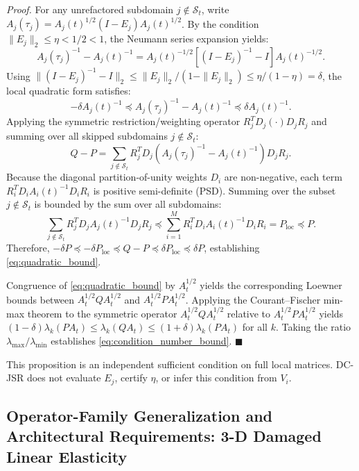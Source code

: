 \noindent\textit{Proof.}
For any unrefactored subdomain $j \notin \mathcal{S}_t$, write $A_j(\tau_j) = A_j(t)^{1/2} (I - E_j) A_j(t)^{1/2}$. By the condition $\|E_j\|_2 \le \eta < 1/2 < 1$, the Neumann series expansion yields:
\begin{equation}
A_j(\tau_j)^{-1} - A_j(t)^{-1} = A_j(t)^{-1/2} \left[ (I - E_j)^{-1} - I \right] A_j(t)^{-1/2}.
\end{equation}
Using $\|(I - E_j)^{-1} - I\|_2 \le \|E_j\|_2 / (1 - \|E_j\|_2) \le \eta / (1 - \eta) = \delta$, the local quadratic form satisfies:
\begin{equation}
-\delta A_j(t)^{-1} \preceq A_j(\tau_j)^{-1} - A_j(t)^{-1} \preceq \delta A_j(t)^{-1}.
\end{equation}
Applying the symmetric restriction/weighting operator $R_j^T D_j (\cdot) D_j R_j$ and summing over all skipped subdomains $j \notin \mathcal{S}_t$:
\begin{equation}
Q - P = \sum_{j \notin \mathcal{S}_t} R_j^T D_j \left( A_j(\tau_j)^{-1} - A_j(t)^{-1} \right) D_j R_j.
\end{equation}
Because the diagonal partition-of-unity weights $D_i$ are non-negative, each term $R_i^T D_i A_i(t)^{-1} D_i R_i$ is positive semi-definite (PSD). Summing over the subset $j \notin \mathcal{S}_t$ is bounded by the sum over all subdomains:
\begin{equation}
\sum_{j \notin \mathcal{S}_t} R_j^T D_j A_j(t)^{-1} D_j R_j \preceq \sum_{i=1}^M R_i^T D_i A_i(t)^{-1} D_i R_i = P_{\text{loc}} \preceq P.
\end{equation}
Therefore, $-\delta P \preceq -\delta P_{\text{loc}} \preceq Q - P \preceq \delta P_{\text{loc}} \preceq \delta P$, establishing \eqref{eq:quadratic_bound}. 

Congruence of \eqref{eq:quadratic_bound} by $A_t^{1/2}$ yields the corresponding Loewner bounds between $A_t^{1/2}QA_t^{1/2}$ and $A_t^{1/2}PA_t^{1/2}$. Applying the Courant--Fischer min-max theorem to the symmetric operator $A_t^{1/2} Q A_t^{1/2}$ relative to $A_t^{1/2} P A_t^{1/2}$ yields $(1 - \delta) \lambda_k(P A_t) \le \lambda_k(Q A_t) \le (1 + \delta) \lambda_k(P A_t)$ for all $k$. Taking the ratio $\lambda_{\max} / \lambda_{\min}$ establishes \eqref{eq:condition_number_bound}. \hfill $\blacksquare$


This proposition is an independent sufficient condition on full local matrices. DC-JSR does not evaluate $E_j$, certify $\eta$, or infer this condition from $V_i$.

\subsection{Operator-Family Generalization and Architectural Requirements: 3-D Damaged Linear Elasticity}
\label{subsec:elasticity_generalization}


